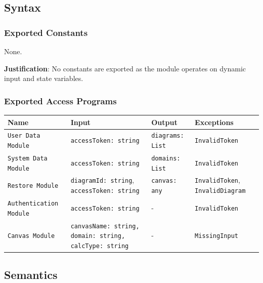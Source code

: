 \documentclass[12pt, titlepage]{article}
\begin{document}
\subsection{Syntax}

\subsubsection{Exported Constants}
None. 

\textbf{Justification}: No constants are exported as the module operates on dynamic input and state variables.

\subsubsection{Exported Access Programs}

\begin{center}
  \begin{tabular}{p{4cm} p{4cm} p{4cm} p{2cm}}
    \hline
    \textbf{Name} & \textbf{Input} & \textbf{Output} & \textbf{Exceptions} \\
    \hline
    \texttt{User Data Module} & \texttt{accessToken: string} & \texttt{diagrams: List} & \texttt{InvalidToken} \\
    \texttt{System Data Module} & \texttt{accessToken: string} & \texttt{domains: List} & \texttt{InvalidToken} \\
    \texttt{Restore Module} & \texttt{diagramId: string}, \texttt{accessToken: string} & \texttt{canvas: any} & \texttt{InvalidToken}, \texttt{InvalidDiagram} \\
    \texttt{Authentication Module} & \texttt{accessToken: string} & - & \texttt{InvalidToken} \\
    \texttt{Canvas Module} & \texttt{canvasName: string, domain: string, calcType: string} & - & \texttt{MissingInput} \\
    \hline
  \end{tabular}
\end{center}

\subsection{Semantics}
\end{document}
